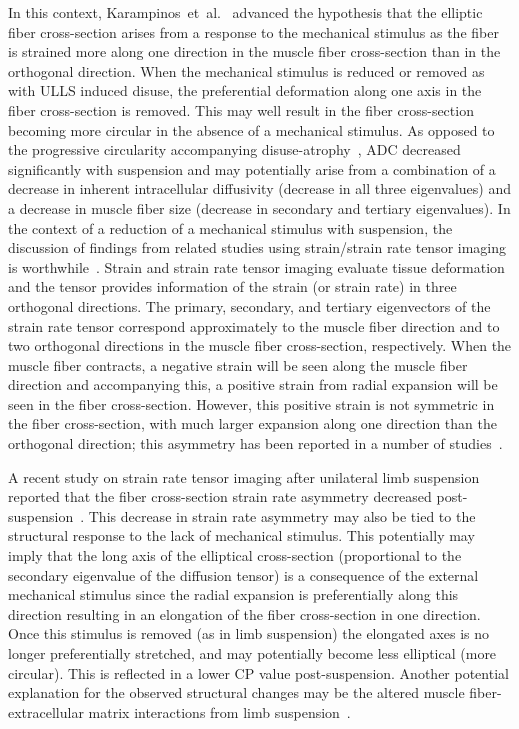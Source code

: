 In this context, Karampinos~et~al.~\cite{RND12} advanced the hypothesis that the elliptic fiber cross-section arises from a response to the mechanical stimulus as the fiber is strained more along one direction in the muscle fiber cross-section than in the orthogonal direction. 
When the mechanical stimulus is reduced or removed as with ULLS induced disuse, the preferential deformation along one axis in the fiber cross-section is removed.
This may well result in the fiber cross-section becoming more circular in the absence of a mechanical stimulus.
As opposed to the progressive circularity accompanying disuse-atrophy~\cite{RND36},
ADC decreased significantly with suspension and may potentially arise from a combination of a decrease in inherent intracellular diffusivity (decrease in all three eigenvalues) and a decrease in muscle fiber size (decrease in secondary and tertiary eigenvalues).
In the context of a reduction of a mechanical stimulus with suspension, the discussion of findings from related studies using strain/strain rate tensor imaging is worthwhile~\cite{RNSS4, RNCS4, Malis:2018fr, RNS16}. 
Strain and strain rate tensor imaging evaluate tissue deformation and the tensor provides information of the strain (or strain rate) in three orthogonal directions. 
The primary, secondary, and tertiary eigenvectors of the strain rate tensor correspond approximately to the muscle fiber direction and to two orthogonal directions in the muscle fiber cross-section, respectively. 
When the muscle fiber contracts, a negative strain will be seen along the muscle fiber direction and accompanying this, a positive strain from radial expansion will be seen in the fiber cross-section.
However, this positive strain is not symmetric in the fiber cross-section, with much larger expansion along one direction than the orthogonal direction; this asymmetry has been reported in a number of studies~\cite{Malis:2018fr, RNS16, RNS31}.

A recent study on strain rate tensor imaging after unilateral limb suspension reported that the fiber cross-section strain rate asymmetry decreased post-suspension~\cite{Malis:2018fr}.
This decrease in strain rate asymmetry may also be tied to the structural response to the lack of mechanical stimulus.
This potentially may imply that the long axis of the elliptical cross-section (proportional to the secondary eigenvalue of the diffusion tensor) is a consequence of the external mechanical stimulus since the radial expansion is preferentially along this direction resulting in an elongation of the fiber cross-section in one direction. Once this stimulus is removed (as in limb suspension) the elongated axes is no longer preferentially stretched, and may potentially become less elliptical (more circular).
This is reflected in a lower CP value post-suspension. 
Another potential explanation for the observed structural changes may be the altered muscle fiber-extracellular matrix interactions from limb suspension~\cite{RNSS4, RNCS4}. 

